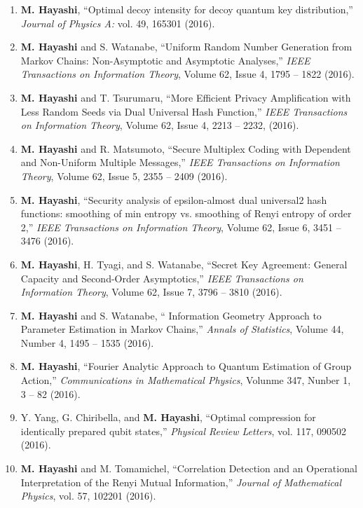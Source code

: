\documentclass[a4paper,12pt,oneside]{article}
\begin{document}
\begin{enumerate}
\item 
\textbf{M. Hayashi}, 
``Optimal decoy intensity for decoy quantum key distribution,'' 
{\em Journal of Physics A:} vol. 49, 165301 (2016). 

\item 
\textbf{M. Hayashi} and S. Watanabe, ``Uniform Random Number Generation from Markov Chains: Non-Asymptotic and Asymptotic Analyses,'' 
{\em IEEE Transactions on Information Theory}, Volume 62, Issue 4, 1795 -- 1822 (2016). 

\item 
\textbf{M. Hayashi} and T. Tsurumaru, ``More Efficient Privacy Amplification with Less Random Seeds via Dual Universal Hash Function,'' 
{\em IEEE Transactions on Information Theory}, 
Volume 62, Issue 4, 2213 -- 2232, (2016). 

\item 
\textbf{M. Hayashi} and R. Matsumoto, ``Secure Multiplex Coding with Dependent and Non-Uniform Multiple Messages,'' 
{\em IEEE Transactions on Information Theory}, Volume 62, Issue 5, 2355 -- 2409 (2016). 

\item 
\textbf{M. Hayashi}, ``Security analysis of epsilon-almost dual universal2 hash functions: smoothing of min entropy vs. smoothing of Renyi entropy of order 2,'' 
{\em IEEE Transactions on Information Theory}, Volume 62, Issue 6, 3451 -- 3476 (2016). 

\item 
\textbf{M. Hayashi}, H. Tyagi, and S. Watanabe, ``Secret Key Agreement: General Capacity and Second-Order Asymptotics,'' 
{\em IEEE Transactions on Information Theory}, Volume 62, Issue 7, 3796 -- 3810 (2016). 

\item 
\textbf{M. Hayashi} and S. Watanabe, `` Information Geometry Approach to Parameter Estimation in Markov Chains,'' 
{\em Annals of Statistics}, Volume 44, Number 4, 1495 -- 1535 (2016). 

\item 
\textbf{M. Hayashi}, 
``Fourier Analytic Approach to Quantum Estimation of Group Action,'' 
{\em Communications in Mathematical Physics}, Volunme 347, Nunber 1, 3 -- 82 (2016). 

\item 
Y. Yang, G. Chiribella, and \textbf{M. Hayashi}, 
``Optimal compression for identically prepared qubit states,'' 
{\em Physical Review Letters}, vol. 117, 090502 (2016).

\item 
\textbf{M. Hayashi} and M. Tomamichel, 
``Correlation Detection and an Operational Interpretation of the Renyi Mutual Information,'' 
{\em Journal of Mathematical Physics}, vol. 57, 102201 (2016).


\end{enumerate}
\end{document}

